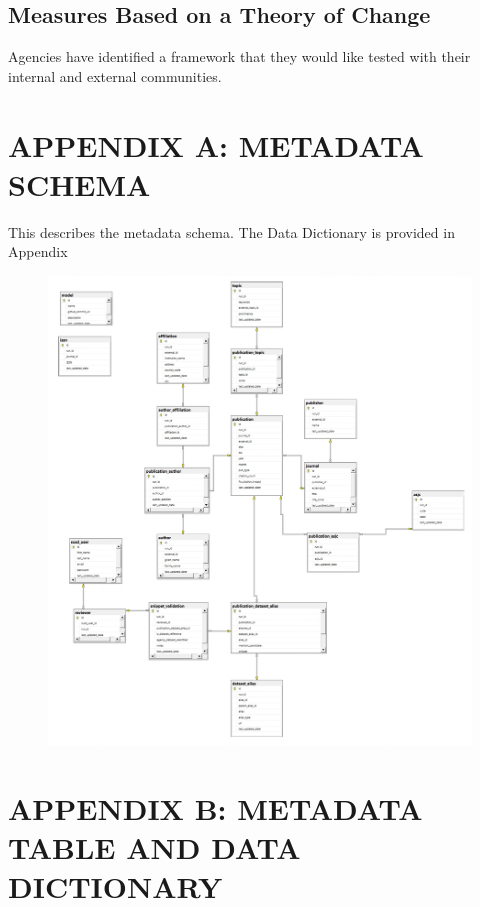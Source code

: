 \documentclass[titlepage, 11pt]{article}
\begin{document}
{\subsection{Measures Based on a Theory of Change}
Agencies have identified a framework that they would like tested with their internal and external communities.

\newpage
\newpage
\section*{APPENDIX A:  METADATA SCHEMA}
\label{sec:APPENDIXA}
This describes the metadata schema. The Data Dictionary is provided in Appendix

\begin{figure}[h!]
  \includegraphics[scale=0.60]{AppendixA.png}
  \label{fig:appendixA}
\end{figure}

\newpage

\section*{APPENDIX B: METADATA TABLE AND DATA DICTIONARY}
\label{sec:APPENDIXB}

}
\end{document}
